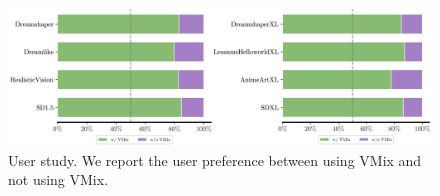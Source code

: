\begin{figure}
    \centering
    \includegraphics[width=0.85\linewidth]{user_study.pdf}
    \caption{User study. We report the user preference between using VMix and not using VMix.}
    \label{fig7}
\end{figure}

\begin{figure}[ht]
\end{figure}
